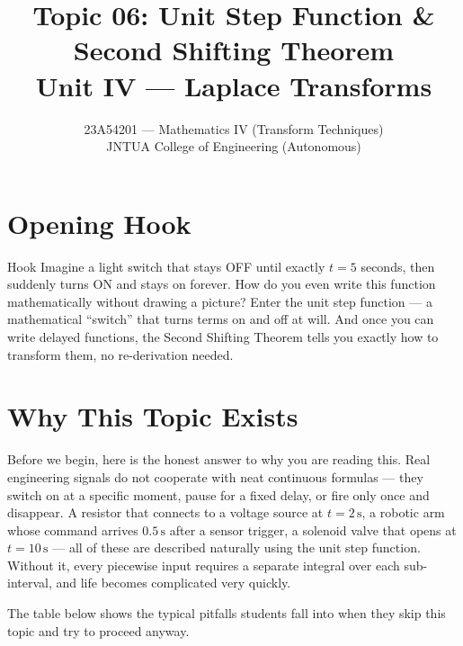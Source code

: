 \documentclass[12pt,a4paper]{article}
\title{Topic 06: Unit Step Function \& Second Shifting Theorem \\
       \large Unit IV --- Laplace Transforms}
\author{23A54201 --- Mathematics IV (Transform Techniques) \\
        JNTUA College of Engineering (Autonomous)}
\date{}
\begin{document}
\maketitle
\tableofcontents
\newpage

\section{Opening Hook}

\begin{curiositybox}{Hook}
Imagine a light switch that stays OFF until exactly $t = 5$ seconds, then suddenly turns ON
and stays on forever.
How do you even write this function mathematically without drawing a picture?
Enter the unit step function --- a mathematical ``switch'' that turns terms on and off at will.
And once you can write delayed functions, the Second Shifting Theorem tells you exactly how
to transform them, no re-derivation needed.
\end{curiositybox}

\section{Why This Topic Exists}

Before we begin, here is the honest answer to why you are reading this.
Real engineering signals do not cooperate with neat continuous formulas --- they switch on
at a specific moment, pause for a fixed delay, or fire only once and disappear.
A resistor that connects to a voltage source at $t = 2\,\text{s}$, a robotic arm whose
command arrives $0.5\,\text{s}$ after a sensor trigger, a solenoid valve that opens at
$t = 10\,\text{s}$ --- all of these are described naturally using the unit step function.
Without it, every piecewise input requires a separate integral over each sub-interval,
and life becomes complicated very quickly.

The table below shows the typical pitfalls students fall into when they skip this topic and
try to proceed anyway.
\end{document}
